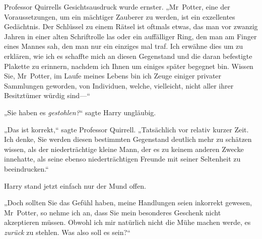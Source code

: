 Professor Quirrells Gesichtsausdruck wurde ernster. „Mr~Potter, eine der Voraussetzungen, um ein mächtiger Zauberer zu werden, ist ein exzellentes Gedächtnis. Der Schlüssel zu einem Rätsel ist oftmals etwas, das man vor zwanzig Jahren in einer alten Schriftrolle las oder ein auffälliger Ring, den man am Finger eines Mannes sah, den man nur ein einziges mal traf. Ich erwähne dies um zu erklären, wie ich es schaffte mich an diesen Gegenstand und die daran befestigte Plakette zu erinnern, nachdem ich Ihnen um einiges später begegnet bin. Wissen Sie, Mr~Potter, im Laufe meines Lebens bin ich Zeuge einiger privater Sammlungen geworden, von Individuen, welche, vielleicht, nicht aller ihrer Besitztümer würdig sind—“

„Sie haben es \emph{gestohlen?}“ sagte Harry ungläubig.

„Das ist korrekt,“ sagte Professor Quirrell. „Tatsächlich vor relativ kurzer Zeit. Ich denke, Sie werden diesen bestimmten Gegenstand deutlich mehr zu schätzen wissen, als der niederträchtige kleine Mann, der es zu keinem anderen Zwecke innehatte, als seine ebenso niederträchtigen Freunde mit seiner Seltenheit zu beeindrucken.“

Harry stand jetzt einfach nur der Mund offen.

„Doch sollten Sie das Gefühl haben, meine Handlungen seien inkorrekt gewesen, Mr~Potter, so nehme ich an, dass Sie mein besonderes Geschenk nicht akzeptieren müssen. Obwohl ich mir natürlich nicht die Mühe machen werde, es \emph{zurück} zu stehlen. Was also soll es sein?“

